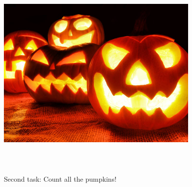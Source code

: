 \documentclass[12pt]{article}
\begin{document}
\newpage

\includegraphics[width=10cm,height=10cm,keepaspectratio]{img/pumpkin.jpg}

Second task: Count all the pumpkins!
\end{document}
